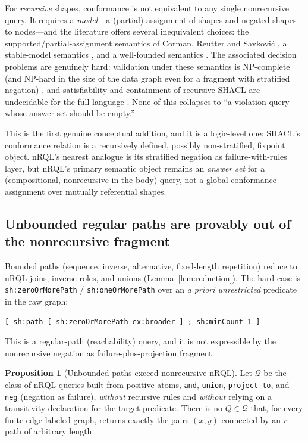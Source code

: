 \documentclass[11pt,letterpaper]{article}
\theoremstyle{definition}
\newtheorem{proposition}{Proposition}
\newcommand{\nrql}{nRQL}
\newcommand{\shacl}{SHACL}
\newcommand{\naf}{negation as failure}
\begin{document}
For \emph{recursive} shapes, conformance is not equivalent to any single nonrecursive query. It requires a \emph{model}---a (partial) assignment of shapes and negated shapes to nodes---and the literature offers several inequivalent choices: the supported/partial-assignment semantics of Corman, Reutter and Savkovi\'c \cite{recshacl}, a stable-model semantics \cite{stableshacl}, and a well-founded semantics \cite{wfshacl}. The associated decision problems are genuinely hard: validation under these semantics is NP-complete (and NP-hard in the size of the data graph even for a fragment with stratified negation) \cite{recshacl}, and satisfiability and containment of recursive \shacl{} are undecidable for the full language \cite{satcont}. None of this collapses to ``a violation query whose answer set should be empty.''

This is the first genuine conceptual addition, and it is a logic-level one: \shacl{}'s conformance relation is a recursively defined, possibly non-stratified, fixpoint object. \nrql{}'s nearest analogue is its stratified \naf{}-with-rules layer, but \nrql{}'s primary semantic object remains an \emph{answer set} for a (compositional, nonrecursive-in-the-body) query, not a global conformance assignment over mutually referential shapes.

\subsection{Unbounded regular paths are provably out of the nonrecursive fragment}\label{sec:paths}
Bounded paths (sequence, inverse, alternative, fixed-length repetition) reduce to \nrql{} joins, inverse roles, and unions (Lemma~\ref{lem:reduction}). The hard case is \texttt{sh:zeroOrMorePath} / \texttt{sh:oneOrMorePath} over an \emph{a priori unrestricted} predicate in the raw graph:
\begin{lstlisting}[language=turtle]
[ sh:path [ sh:zeroOrMorePath ex:broader ] ; sh:minCount 1 ]
\end{lstlisting}
This is a regular-path (reachability) query, and it is not expressible by the nonrecursive \naf{}-plus-projection fragment.

\begin{proposition}[Unbounded paths exceed nonrecursive \nrql{}]\label{prop:paths}
Let $\mathcal{Q}$ be the class of \nrql{} queries built from positive atoms, \texttt{and}, \texttt{union}, \texttt{project-to}, and \texttt{neg} (\naf{}), \emph{without} recursive rules and \emph{without} relying on a transitivity declaration for the target predicate. There is no $Q\in\mathcal{Q}$ that, for every finite edge-labeled graph, returns exactly the pairs $(x,y)$ connected by an $r$-path of arbitrary length.
\end{proposition}
\end{document}
